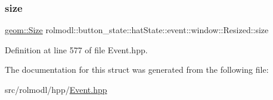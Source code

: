 \subsubsection{\texorpdfstring{size}{size}}
{\footnotesize\ttfamily \mbox{\hyperlink{structrolmodl_1_1geom_1_1_size}{geom\+::\+Size}} rolmodl\+::button\+\_\+state\+::hat\+State\+::event\+::window\+::\+Resized\+::size}



Definition at line 577 of file Event.\+hpp.



The documentation for this struct was generated from the following file\+:\begin{DoxyCompactItemize}
\item 
src/rolmodl/hpp/\mbox{\hyperlink{_event_8hpp}{Event.\+hpp}}\end{DoxyCompactItemize}
